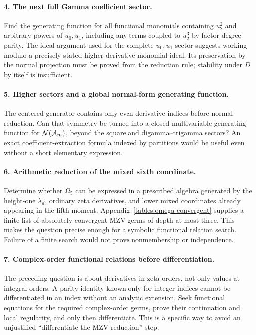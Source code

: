\paragraph{4. The next full Gamma coefficient sector.}
Find the generating function for all functional monomials containing
$u_2^2$ and arbitrary powers of $u_0,u_1$, including any terms
coupled to $u_2^3$ by factor-degree parity.
The ideal argument used for the complete $u_0,u_1$ sector suggests
working modulo a precisely stated higher-derivative monomial ideal.
Its preservation by the normal projection must be proved from the
reduction rule; stability under $D$ by itself is insufficient.

\paragraph{5. Higher sectors and a global normal-form generating function.}
The centered generator contains only even derivative indices before
normal reduction.  Can that symmetry be turned into a closed
multivariable generating function for $\mathcal N(\mathcal A_m)$, beyond the
square and digamma--trigamma sectors?  An exact coefficient-extraction
formula indexed by partitions would be useful even without a short
elementary expression.

\paragraph{6. Arithmetic reduction of the mixed sixth coordinate.}
Determine whether $\Omega_5$ can be expressed in a prescribed
algebra generated by the height-one $\lambda_d$, ordinary zeta
derivatives, and lower mixed coordinates already appearing in the
fifth moment.  Appendix~\ref{tables:omega-convergent} supplies a
finite list of absolutely convergent MZV germs of depth at most three.
This makes the question precise enough for a symbolic functional
relation search.  Failure of a finite search would not prove
nonmembership or independence.

\paragraph{7. Complex-order functional relations before differentiation.}
The preceding question is about derivatives in zeta orders, not only
values at integral orders.  A parity identity known only for integer
indices cannot be differentiated in an index without an analytic
extension.  Seek functional equations for the required complex-order
germs, prove their continuation and local regularity, and only then
differentiate.  This is a specific way to avoid an unjustified
``differentiate the MZV reduction'' step.

